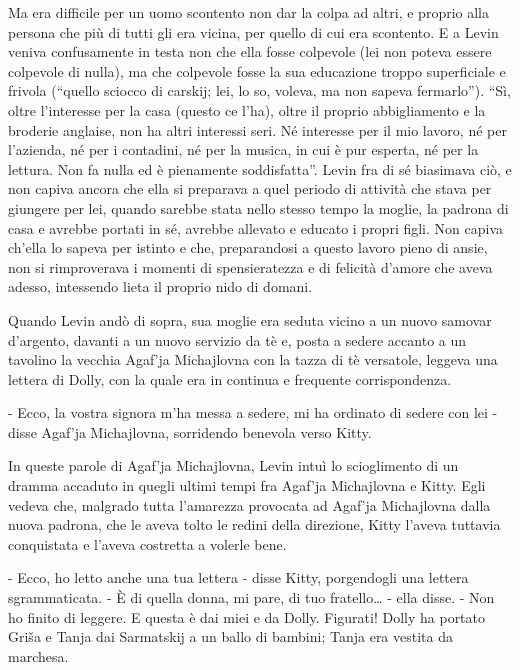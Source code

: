 Ma era difficile per un uomo scontento non dar la colpa ad altri, e proprio alla persona che più di tutti gli era vicina, per quello di cui era scontento. E a Levin veniva confusamente in testa non che ella fosse colpevole (lei non poteva essere colpevole di nulla), ma che colpevole fosse la sua educazione troppo superficiale e frivola (``quello sciocco di carskij; lei, lo so, voleva, ma non sapeva fermarlo''). ``Sì, oltre l'interesse per la casa (questo ce l'ha), oltre il proprio abbigliamento e la broderie anglaise, non ha altri interessi seri. Né interesse per il mio lavoro, né per l'azienda, né per i contadini, né per la musica, in cui è pur esperta, né per la lettura. Non fa nulla ed è pienamente soddisfatta''. Levin fra di sé biasimava ciò, e non capiva ancora che ella si preparava a quel periodo di attività che stava per giungere per lei, quando sarebbe stata nello stesso tempo la moglie, la padrona di casa e avrebbe portati in sé, avrebbe allevato e educato i propri figli. Non capiva ch'ella lo sapeva per istinto e che, preparandosi a questo lavoro pieno di ansie, non si rimproverava i momenti di spensieratezza e di felicità d'amore che aveva adesso, intessendo lieta il proprio nido di domani. 

\label{xvi-4} 

Quando Levin andò di sopra, sua moglie era seduta vicino a un nuovo samovar d'argento, davanti a un nuovo servizio da tè e, posta a sedere accanto a un tavolino la vecchia Agaf'ja Michajlovna con la tazza di tè versatole, leggeva una lettera di Dolly, con la quale era in continua e frequente corrispondenza. 

- Ecco, la vostra signora m'ha messa a sedere, mi ha ordinato di sedere con lei - disse Agaf'ja Michajlovna, sorridendo benevola verso Kitty. 

In queste parole di Agaf'ja Michajlovna, Levin intuì lo scioglimento di un dramma accaduto in quegli ultimi tempi fra Agaf'ja Michajlovna e Kitty. Egli vedeva che, malgrado tutta l'amarezza provocata ad Agaf'ja Michajlovna dalla nuova padrona, che le aveva tolto le redini della direzione, Kitty l'aveva tuttavia conquistata e l'aveva costretta a volerle bene. 

- Ecco, ho letto anche una tua lettera - disse Kitty, porgendogli una lettera sgrammaticata. - È di quella donna, mi pare, di tuo fratello\ldots{} - ella disse. - Non ho finito di leggere. E questa è dai miei e da Dolly. Figurati! Dolly ha portato Griša e Tanja dai Sarmatskij a un ballo di bambini; Tanja era vestita da marchesa. 

